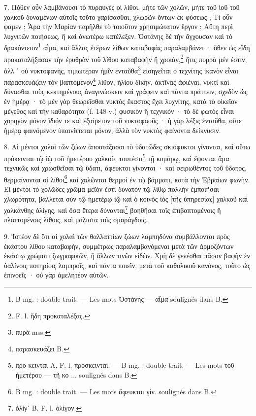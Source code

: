 \documentclass[a4paper, 11pt, oneside, polutonikogreek, french]{article}
\begin{document}
7. Πόθεν οὖν λαμβάνουσι τὸ πυραυγὲς οἱ λίθοι, μήτε τῶν χολῶν, μήτε τοῦ ἰοῦ τοῦ χαλκοῦ δυναμένων αὐτοῖς τοῦτο χαρίσασθαι, χλωρῶν ὄντων ἐκ φύσεως ; Τί οὖν φαμεν ; Ἆρα τὴν Μαρίαν παρῆλθε τὸ τοιοῦτον χρησιμώτατον ἔργον ; Αὕτη περὶ λυχνιτῶν ποιήσεως, ἣ καὶ ἀνωτέρω κατέλεξεν. Ὀστάνης δὲ τὴν ἄγχουσαν καὶ τὸ δρακόντειον\footnote{B mg. : double trait. --- Les mots Ὀστάνης --- αἷμα soulignés dans B.} αἷμα, καὶ ἄλλας ἑτέρων λίθων καταβαφὰς παραλαμβάνει · ὅθεν ὡς εἴδη προκαταλήξασαν τὴν ἐρυθρὰν τοῦ λίθου καταβαφὴν ἢ χροιὰν,\footnote{F. l. ἤδη προκαταλέξας.} ἥτις πυρρὰ μέν ἐστιν, ἀλλ ᾽ οὐ νυκτοφανὴς, τιμιωτέραν ἡμῖν ἐνταῦθα\footnote{πυρὰ mss.} εἰσηγεῖται ὁ τεχνίτης ἱκανὸν εἶναι παρασκευάζειν τὸν βαπτόμενον\footnote{παρασκευάζει B.} λίθον, ἡλίου δίκην, ἀκτῖνας ἀφιέναι, νυκτὶ καὶ δύνασθαι τοὺς κεκτημένους ἀναγινώσκειν καὶ γράφειν καὶ πάντα πράττειν, σχεδὸν ὡς ἐν ἡμέρᾳ · τὸ μὲν γὰρ θεωρεῖσθαι νυκτὸς ἕκαστος ἔχει λυχνίτης, κατὰ τὸ οἰκεῖον μέγεθος καὶ τὴν καθαρότητα (f. 148 v.) φυσικὸν ἢ τεχνικόν · τὸ δὲ φωτὸς εἶναι χορηγὸν μόνον ἴδιόν τε καὶ ἐξαίρετον τοῦ νυκτοφαοῦς · ἡ γὰρ λέξις ἐνταῦθα, οὔτε ἡμέρᾳ φαινόμενον ὑπαινίττεται μόνον, ἀλλὰ τὸν νυκτὸς φαίνοντα δείκνυσιν.

8. Αἱ μέντοι χολαὶ τῶν ζώων ἀποστάξασαι τὸ ὑδατῶδες σκιόφυκτοι γίνονται, καὶ οὕτω πρόκεινται τῷ ἰῷ τοῦ ἡμετέρου χαλκοῦ, τουτέστι\footnote{προ κεινται A. F. l. πρόσκεινται. --- B mg. : double trait. --- Les mots τοῦ ἡμετέρου --- τῆ κο ... soulignés dans B.} τῇ κομάρῳ, καὶ ἕψονται ἅμα τεχνικῶς καὶ χρωσθεῖσαι τῷ ὕδατι, ἄφευκτοι γίνονται · καὶ σειρωθέντος τοῦ ὕδατος, θερμαίνονται οἱ λίθοι\footnote{B mg. : double trait. --- Les mots ἄφευκτοι γίν. soulignés dans B.} καὶ χαλῶνται θερμοὶ ἐν τῷ βάμματι, κατὰ τὴν Ἑβραίων φωνὴν. Εἰ μέντοι τὸ χολῶδες χρῶμα μεῖόν ἐστι δυνατὸν τῷ λίθῳ πολλὴν ἐμποιῆσαι χλωρότητα, βάλλεται σὺν τῷ ἡμετέρῳ ἰῷ καὶ ὁ κοινὸς ἰὸς [τῆς ὑπηρεσίας] χαλκοῦ καὶ χαλκάνθης ὀλίγης, καὶ ὅσα ἕτερα δύνανται\footnote{ὀλίγʹ B. F. l. ὀλίγον.} βοηθῆσαι τοῖς ἐπιβαπτομένοις ἢ πλαττομένοις λίθοις, καὶ μάλιστα τοῖς σμαράγδοις.

9. Ἰστέον δὲ ὅτι αἰ χολαὶ τῶν θαλλαττίων ζώων λαμπηδόνα συμβάλλονται πρὸς ἑκάστου λίθου καταβαφὴν, συμμέτρως παραλαμβανόμεναι μετὰ τῶν ἀρμοζόντων ἑκάστῳ χρώματι ζωγραφικῶν, ἢ ἄλλων τινῶν εἰδῶν. Χρὴ δὲ γενέσθαι πᾶσαν βαφὴν ἐν ὑαλίνοις ποτηρίοις λαμπροῖς, καὶ πάντα ποιεῖν, μετὰ τοῦ καθολικοῦ κανόνος, τοῦτο ὡς ἐπινοεῖς · οὐ γὰρ ἀμελητέον αὐτῶν.
\end{document}

